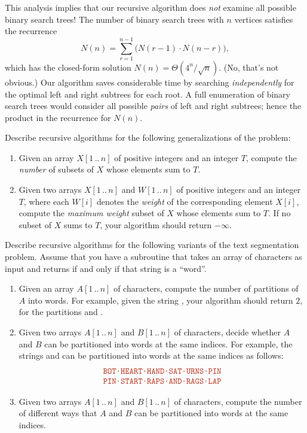 This analysis implies that our recursive algorithm does \textit{not} examine all possible binary search trees!
The number of binary search trees with $n$ vertices satisfies the recurrence
\[
N(n) = \sum_{r=1}^{n-1} \bigl(N(r-1) \cdot N(n-r)\bigr),
\]
which has the closed-form solution $N(n) = \Theta(4^n/\sqrt{n})$.
(No, that’s not obvious.)
Our algorithm saves considerable time by searching \textit{independently} for the optimal left and right subtrees for each root.
A full enumeration of binary search trees would consider all possible \textit{pairs} of left and right subtrees; hence the product in the recurrence for $N(n)$.

\begin{exercises}
\item Describe recursive algorithms for the following generalizations of the  problem:
\begin{enumerate}
\item Given an array $X[1\,..\,n]$ of positive integers and an integer $T$, compute the \textit{number} of subsets of $X$ whose elements sum to $T$.
\item Given two arrays $X[1\,..\,n]$ and $W[1\,..\,n]$ of positive integers and an integer $T$, where each $W[i]$ denotes the \textit{weight} of the corresponding element $X[i]$, compute the \textit{maximum weight} subset of $X$ whose elements sum to $T$.
If no subset of $X$ sums to $T$, your algorithm should return $-\infty$.
\end{enumerate}

\item Describe recursive algorithms for the following variants of the text segmentation problem.
Assume that you have a subroutine  that takes an array of characters as input and returns  if and only if that string is a “word”.
\begin{enumerate}
\item Given an array $A[1\,..\,n]$ of characters, compute the number of partitions of $A$ into words.
For example, given the string , your algorithm should return $2$, for the partitions  and .
\item Given two arrays $A[1\,..\,n]$ and $B[1\,..\,n]$ of characters, decide whether $A$ and $B$ can be partitioned into words at the same indices.
For example, the strings  and  can be partitioned into words at the same indices as follows:
\[
\begin{array}{c}
\mbox{\Str{BOT·HEART·HAND·SAT·URNS·PIN}}\\
\mbox{\Str{PIN·START·RAPS·AND·RAGS·LAP}}
\end{array}
\]
\item Given two arrays $A[1\,..\,n]$ and $B[1\,..\,n]$ of characters, compute the number of different ways that $A$ and $B$ can be partitioned into words at the same indices.
\end{enumerate}


\end{exercises}
